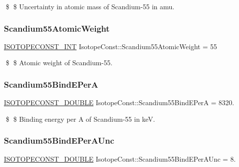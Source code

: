 \$ \$ Uncertainty in atomic mass of Scandium-\/55 in amu. \mbox{\label{group___isotope_const-_scandium-_sc55_gad3fbb28c400ce0092cdc05a8d8a56a73}} 
\subsubsection{\texorpdfstring{Scandium55\+Atomic\+Weight}{Scandium55AtomicWeight}}
{\footnotesize\ttfamily \mbox{\hyperlink{group___isotope_const-_macros_ga5f18360b3e99483a35c32d789e62621c}{I\+S\+O\+T\+O\+P\+E\+C\+O\+N\+S\+T\+\_\+\+I\+NT}} Isotope\+Const\+::\+Scandium55\+Atomic\+Weight = 55}

\$ \$ Atomic weight of Scandium-\/55. \mbox{\label{group___isotope_const-_scandium-_sc55_ga9a21a769f9ec182544e0539accd6c626}} 
\subsubsection{\texorpdfstring{Scandium55\+Bind\+E\+PerA}{Scandium55BindEPerA}}
{\footnotesize\ttfamily \mbox{\hyperlink{group___isotope_const-_macros_ga8f45a7272ce02c0b4c65c44636ed719a}{I\+S\+O\+T\+O\+P\+E\+C\+O\+N\+S\+T\+\_\+\+D\+O\+U\+B\+LE}} Isotope\+Const\+::\+Scandium55\+Bind\+E\+PerA = 8320.}

\$ \$ Binding energy per A of Scandium-\/55 in keV. \mbox{\label{group___isotope_const-_scandium-_sc55_gab70823cc9502b7917060981569d4aad1}} 
\subsubsection{\texorpdfstring{Scandium55\+Bind\+E\+Per\+A\+Unc}{Scandium55BindEPerAUnc}}
{\footnotesize\ttfamily \mbox{\hyperlink{group___isotope_const-_macros_ga8f45a7272ce02c0b4c65c44636ed719a}{I\+S\+O\+T\+O\+P\+E\+C\+O\+N\+S\+T\+\_\+\+D\+O\+U\+B\+LE}} Isotope\+Const\+::\+Scandium55\+Bind\+E\+Per\+A\+Unc = 8.}

